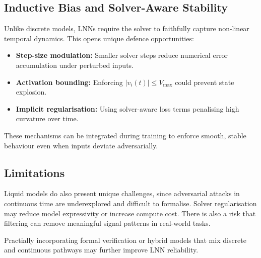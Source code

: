 \subsection*{Inductive Bias and Solver-Aware Stability}

Unlike discrete models, LNNs require the solver to faithfully capture non-linear temporal dynamics. This opens unique defence opportunities:
\begin{itemize}
\item \textbf{Step-size modulation:} Smaller solver steps reduce numerical error accumulation under perturbed inputs.
\item \textbf{Activation bounding:} Enforcing $|v_i(t)| \leq V_\text{max}$ could prevent state explosion.
\item \textbf{Implicit regularisation:} Using solver-aware loss terms penalising high curvature over time.
\end{itemize}

These mechanisms can be integrated during training to enforce smooth, stable behaviour even when inputs deviate adversarially.

\subsection*{Limitations}

Liquid models do also present unique challenges, since adversarial attacks in continuous time are underexplored and difficult to formalise. Solver regularisation may reduce model expressivity or increase compute cost. There is also a risk that filtering can remove meaningful signal patterns in real-world tasks.

Practially incorporating formal verification \cite{zhang2022towards} or hybrid models that mix discrete and continuous pathways may further improve LNN reliability.

